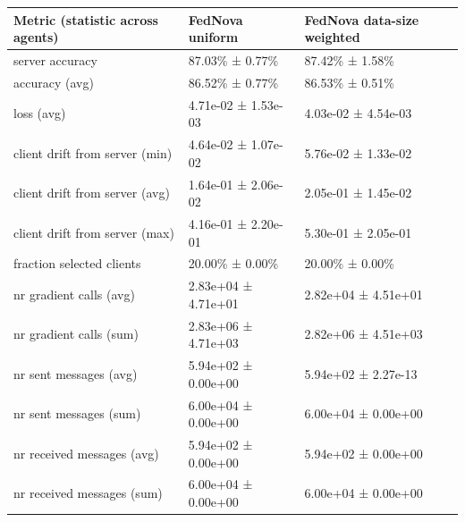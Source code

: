 \begin{tabular}{lll}
\hline
 Metric (statistic across agents)   & FedNova uniform     & FedNova data-size weighted   \\
\hline
 server accuracy                    & 87.03\% ± 0.77\%      & 87.42\% ± 1.58\%               \\
 accuracy (avg)                     & 86.52\% ± 0.77\%      & 86.53\% ± 0.51\%               \\
 loss (avg)                         & 4.71e-02 ± 1.53e-03 & 4.03e-02 ± 4.54e-03          \\
 client drift from server (min)     & 4.64e-02 ± 1.07e-02 & 5.76e-02 ± 1.33e-02          \\
 client drift from server (avg)     & 1.64e-01 ± 2.06e-02 & 2.05e-01 ± 1.45e-02          \\
 client drift from server (max)     & 4.16e-01 ± 2.20e-01 & 5.30e-01 ± 2.05e-01          \\
 fraction selected clients          & 20.00\% ± 0.00\%      & 20.00\% ± 0.00\%               \\
 nr gradient calls (avg)            & 2.83e+04 ± 4.71e+01 & 2.82e+04 ± 4.51e+01          \\
 nr gradient calls (sum)            & 2.83e+06 ± 4.71e+03 & 2.82e+06 ± 4.51e+03          \\
 nr sent messages (avg)             & 5.94e+02 ± 0.00e+00 & 5.94e+02 ± 2.27e-13          \\
 nr sent messages (sum)             & 6.00e+04 ± 0.00e+00 & 6.00e+04 ± 0.00e+00          \\
 nr received messages (avg)         & 5.94e+02 ± 0.00e+00 & 5.94e+02 ± 0.00e+00          \\
 nr received messages (sum)         & 6.00e+04 ± 0.00e+00 & 6.00e+04 ± 0.00e+00          \\
\hline
\end{tabular}
